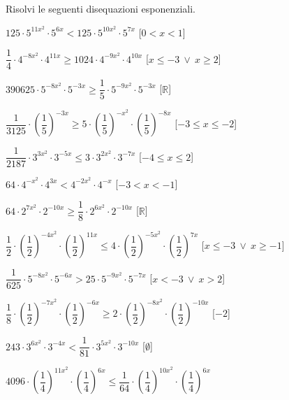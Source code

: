 \begin{esercizio}\label{ese:}
 Risolvi le seguenti disequazioni esponenziali.
 \begin{enumeratea}
  \item  \(125 \cdot 5^{{11x^2}} \cdot 5^{{6x}} < 125 \cdot 5^{{10x^2}} 
\cdot 5^{{7x}}\)
   \hfill [\(0 < x < 1\)]
  \item  \(\dfrac{1}{4} \cdot 4^{{-8x^2}} \cdot 4^{{11x}} \geqslant 1024 
\cdot 4^{{-9x^2}} \cdot 4^{{10x}}\)
   \hfill [\(x \leqslant -3~\vee~x \geqslant 2\)]
  \item  \(390625 \cdot 5^{{-8x^2}} \cdot 5^{{-3x}} \geqslant \dfrac{1}{5} 
\cdot 5^{{-9x^2}} \cdot 5^{{-3x}}\)
   \hfill [\(\mathbb{R}\)]
  \item  \(\dfrac{1}{3125} \cdot \left(\dfrac{1}{5}\right)^{{-3x}} \geqslant 
5 \cdot \left(\dfrac{1}{5}\right)^{{-x^2}} \cdot 
\left(\dfrac{1}{5}\right)^{{-8x}}\)
   \hfill [\(-3 \leqslant x \leqslant -2\)]
  \item  \(\dfrac{1}{2187} \cdot 3^{{3x^2}} \cdot 3^{{-5x}} \leqslant 3 
\cdot 3^{{2x^2}} \cdot 3^{{-7x}}\)
   \hfill [\(-4 \leqslant x \leqslant 2\)]
  \item  \(64 \cdot 4^{{-x^2}} \cdot 4^{{3x}} < 4^{{-2x^2}} \cdot 4^{{-x}}\)
   \hfill [\(-3 < x < -1\)]
  \item  \(64 \cdot 2^{{7x^2}} \cdot 2^{{-10x}} \geqslant \dfrac{1}{8} \cdot 
2^{{6x^2}} \cdot 2^{{-10x}}\)
   \hfill [\(\mathbb{R}\)]
  \item  \(\dfrac{1}{2} \cdot \left(\dfrac{1}{2}\right)^{{-4x^2}} \cdot 
\left(\dfrac{1}{2}\right)^{{11x}} \leqslant 4 \cdot 
\left(\dfrac{1}{2}\right)^{{-5x^2}} \cdot \left(\dfrac{1}{2}\right)^{{7x}}\)
   \hfill [\(x \leqslant -3~\vee~x \geqslant -1\)]
  \item  \(\dfrac{1}{625} \cdot 5^{{-8x^2}} \cdot 5^{{-6x}} > 25 \cdot 
5^{{-9x^2}} \cdot 5^{{-7x}}\)
   \hfill [\(x < -3~\vee~x > 2\)]
  \item  \(\dfrac{1}{8} \cdot \left(\dfrac{1}{2}\right)^{{-7x^2}} \cdot 
\left(\dfrac{1}{2}\right)^{{-6x}} \geqslant 2 \cdot 
\left(\dfrac{1}{2}\right)^{{-8x^2}} \cdot 
\left(\dfrac{1}{2}\right)^{{-10x}}\)
   \hfill [\(-2\)]
  \item  \(243 \cdot 3^{{6x^2}} \cdot 3^{{-4x}} < \dfrac{1}{81} \cdot 
3^{{5x^2}} \cdot 3^{{-10x}}\)
   \hfill [\(\emptyset\)]
  \item  \(4096 \cdot \left(\dfrac{1}{4}\right)^{{11x^2}} \cdot 
\left(\dfrac{1}{4}\right)^{{6x}} \leqslant \dfrac{1}{64} \cdot 
\left(\dfrac{1}{4}\right)^{{10x^2}} \cdot \left(\dfrac{1}{4}\right)^{{6x}}\)

\end{enumeratea}
\end{esercizio}
